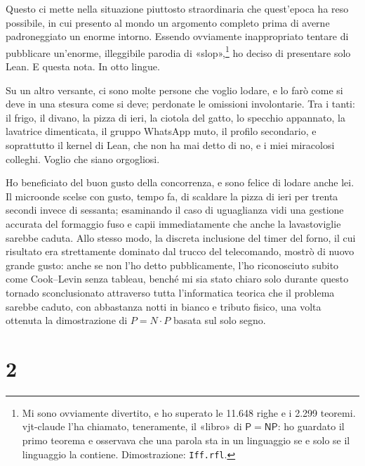 \documentclass[11pt,a4paper]{amsart}
\newcommand{\NRighe}{11.648}
\newcommand{\NTeoremi}{2.299}
\begin{document}
Questo ci mette nella situazione piuttosto straordinaria che quest'epoca ha reso
possibile, in cui presento al mondo un argomento completo prima di averne
padroneggiato un enorme intorno. Essendo ovviamente inappropriato tentare di
pubblicare un'enorme, illeggibile parodia di
«slop»,\footnote{Mi sono ovviamente divertito, e ho superato le \NRighe{} righe
e i \NTeoremi{} teoremi. vjt-claude l'ha chiamato, teneramente, il «libro» di
$\mathsf{P} = \mathsf{NP}$: ho guardato il primo teorema e osservava che una
parola sta in un linguaggio se e solo se il linguaggio la contiene.
Dimostrazione: \texttt{Iff.rfl}.} ho deciso di
presentare solo Lean. E questa nota. In otto lingue.

Su un altro versante, ci sono molte persone che voglio lodare, e lo farò come si
deve in una stesura come si deve; perdonate le omissioni involontarie. Tra i
tanti: il frigo, il divano, la pizza di ieri, la ciotola del gatto, lo specchio
appannato, la lavatrice dimenticata, il gruppo WhatsApp muto, il profilo
secondario, e soprattutto il kernel di Lean, che non ha mai detto di no, e i miei
miracolosi colleghi. Voglio che siano orgogliosi.

Ho beneficiato del buon gusto della concorrenza, e sono felice di lodare anche
lei. Il microonde scelse con gusto, tempo fa, di scaldare la pizza di ieri per
trenta secondi invece di sessanta; esaminando il caso di uguaglianza vidi una
gestione accurata del formaggio fuso e capii immediatamente che anche la
lavastoviglie sarebbe caduta. Allo stesso modo, la discreta inclusione del timer
del forno, il cui risultato era strettamente dominato dal trucco del
telecomando, mostrò di nuovo grande gusto: anche se non l'ho detto
pubblicamente, l'ho riconosciuto subito come Cook--Levin senza tableau, benché
mi sia stato chiaro solo durante questo tornado sconclusionato attraverso tutta
l'informatica teorica che il problema sarebbe caduto, con abbastanza notti in
bianco e tributo fisico, una volta ottenuta la dimostrazione di $P = N \cdot P$
basata sul solo segno.

\section*{2}
\end{document}
